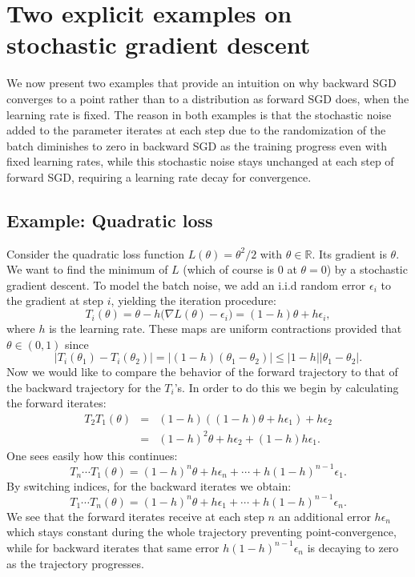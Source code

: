 \documentclass[10pt]{article} %
\theoremstyle{plain}
\theoremstyle{definition}
\theoremstyle{remark}
\begin{document}
\section{Two explicit examples on stochastic gradient descent}\label{sec:examples}

We now present two examples that provide an intuition on why backward SGD converges to a point rather than to a distribution as forward SGD does, when the learning rate is fixed. The reason in both examples is that the stochastic noise added to the parameter iterates at each step due to the randomization of the batch diminishes to zero in backward SGD as the training progress even with fixed learning rates, while this stochastic noise stays unchanged at each step of forward SGD, requiring a learning rate decay for convergence. 

\subsection{Example: Quadratic loss}

Consider the quadratic loss function $L(\theta)=\theta^{2}/2$ with $\theta\in \mathbb R$. Its gradient is $\theta$. We want to find the minimum
of $L$ (which of course is $0$ at $\theta=0$) by a stochastic gradient
descent. To model the batch noise, we add an i.i.d random error $\epsilon_{i}$ to the gradient at step $i$, yielding the iteration procedure:
\[
    T_{i}(\theta)=\theta - h\Big(\nabla L(\theta) - \epsilon_i\Big) = (1-h)\theta+h \epsilon_{i},
\]
where $h$ is the learning rate. 
These maps are uniform contractions provided that $\theta\in (0,1)$ since
\[
|T_i(\theta_1) - T_i(\theta_2)| = |(1-h) (\theta_1 - \theta_2)| \leq |1 - h| |\theta_1 - \theta_2|.
\]
Now we would like to compare the behavior of the forward trajectory to that of the backward trajectory for the $T_i$'s. In order to do this we begin by calculating the forward iterates:
\begin{eqnarray*}
    T_{2}T_{1}(\theta) & = & (1-h)((1-h )\theta+h \epsilon_{1})+h \epsilon_{2}\\
    & = & (1-h)^2\theta + h \epsilon_{2} +(1-h)h\epsilon_{1}.
\end{eqnarray*}
One sees easily how this continues:
\[
    T_n\cdots  T_1(\theta)   =   (1 - h)^n \theta + h \epsilon_n  + \cdots + h (1 - h)^{n-1} \epsilon_1.
\]
By switching indices, for the backward iterates we obtain:
\[
    T_1\cdots  T_n(\theta)   =   (1 - h)^n \theta + h \epsilon_1  + \cdots + h (1 - h)^{n-1} \epsilon_n.
\]
We see that the forward iterates receive at each step $n$ an additional error $h\epsilon_n$ which stays constant during the whole trajectory preventing point-convergence, while for backward iterates that same error  $h (1 - h)^{n-1} \epsilon_n$ is decaying to zero as the trajectory progresses.
\end{document}
